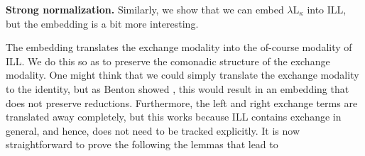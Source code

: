 \documentclass{llncs}
\begin{document}
\textbf{Strong normalization.}  Similarly, we show that we can embed
$\lambda\text{L}_\kappa$ into ILL, but the embedding is a bit more
interesting.

\iffalse
\begin{definition}
  \label{def:embed-lambda-L!-in-ILL}
  The following is an extension of the embedding of $\lambda\text{L}$
  into ILL resulting in an embedding of types and terms of
  $\lambda\text{L}_\kappa$ into ILL:
  \begin{center}
    \begin{math}
      \begin{array}{lrllllllllllllllllll}
        \text{Types:}\\
        & [[(E A) e]] & = & [[! h(A e)]]\\        
        \\
        \text{Terms:}\\
        & [[{lexchange t1 , t2 with x , y in t3} e]] & = & [[ [t2 e/x][t1 e/y]h{t3 e}]]\\
        & [[{rexchange t1 , t2 with x , y in t3} e]] & = & [[ [t2 e/x][t1 e/y]h{t3 e}]]\\
        & [[{promoteE t' for t'' in t} e]] & = & [[promote! t' e for t'' e in h{t e}]]\\
        & [[{derelictE t} e]] & = & [[derelict! h{t e}]]\\
      \end{array}
    \end{math}
  \end{center}
\end{definition}
\fi 

The embedding  translates the exchange modality into the
of-course modality of ILL.  We do this so as to preserve the comonadic
structure of the exchange modality.  One might think that we could
simply translate the exchange modality to the identity, but as Benton
showed \cite{Benton:1995c}, this would result in an embedding that
does not preserve reductions.  Furthermore, the left and right
exchange terms are translated away completely, but this works because
ILL contains exchange in general, and hence, does not need to be
tracked explicitly.  It is now straightforward to prove the following the lemmas that lead to
\end{document}
